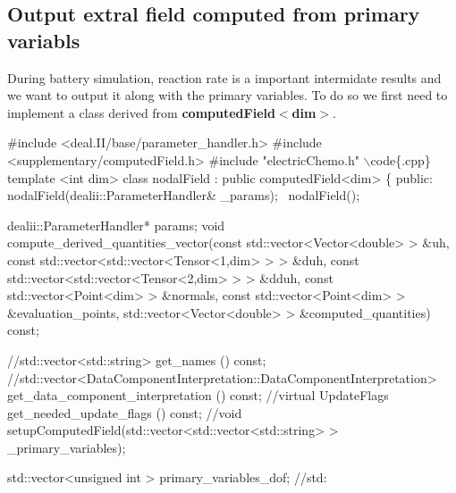 \hypertarget{battery_electrode_scale_computed}{}\subsection{Output extral field computed from primary variabls}\label{battery_electrode_scale_computed}
During battery simulation, reaction rate is a important intermidate results and we want to output it along with the primary variables. To do so we first need to implement a class derived from {\bfseries computed\+Field$<$dim$>$}. 
\begin{DoxyCode}
\textcolor{preprocessor}{#include <deal.II/base/parameter\_handler.h>}
\textcolor{preprocessor}{#include <supplementary/computedField.h>}
\textcolor{preprocessor}{#include "electricChemo.h"}
\(\backslash\)code\{.cpp\}
\textcolor{keyword}{template} <\textcolor{keywordtype}{int} dim>
\textcolor{keyword}{class }nodalField : \textcolor{keyword}{public} computedField<dim>
\{
\textcolor{keyword}{public}:
    nodalField(dealii::ParameterHandler& \_params);
    ~nodalField();
    
    dealii::ParameterHandler* params;
    \textcolor{keywordtype}{void} compute\_derived\_quantities\_vector(\textcolor{keyword}{const} std::vector<Vector<double> > &uh,
                           \textcolor{keyword}{const} std::vector<std::vector<Tensor<1,dim> > > &duh,
                           \textcolor{keyword}{const} std::vector<std::vector<Tensor<2,dim> > > &dduh,
                           \textcolor{keyword}{const} std::vector<Point<dim> >                  &normals,
                           \textcolor{keyword}{const} std::vector<Point<dim> >                  &evaluation\_points,
                           std::vector<Vector<double> >                    &computed\_quantities) \textcolor{keyword}{const};
                                 
    
                                 \textcolor{comment}{//std::vector<std::string> get\_names () const;}
                                 \textcolor{comment}{//std::vector<DataComponentInterpretation::DataComponentInterpretation>
       get\_data\_component\_interpretation () const;}
                                 \textcolor{comment}{//virtual UpdateFlags get\_needed\_update\_flags () const;}
                                 \textcolor{comment}{//void setupComputedField(std::vector<std::vector<std::string> >
       \_primary\_variables);}
                                                             
    std::vector<unsigned int > primary\_variables\_dof;
    \textcolor{comment}{//std:}
\end{DoxyCode}
